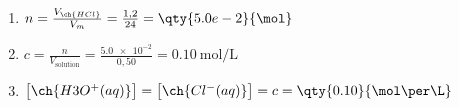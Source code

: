 \begin{enumerate}
    \item $n=\frac{V_{\ch{HCl}}}{V_m}=\frac{1,2}{24}=\qty{5.0e-2}{\mol}$
    \item $c=\frac{n}{V_{\text{solution}}}=
          \frac{\num{5.0e-2}}{0,50}=\qty{0.10}{\mol\per\L}$
    \item {}

          $\bigl[\ch{H3O^+(aq)}\bigr]=\bigl[\ch{Cl^-(aq)}\bigr]=c=
          \qty{0.10}{\mol\per\L}$
\end{enumerate}

